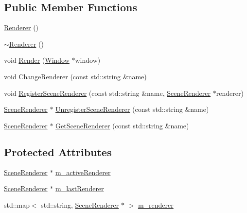 \subsection*{Public Member Functions}
\begin{DoxyCompactItemize}
\item 
\mbox{\hyperlink{classec_1_1_renderer_a1bb0d9ff47eabce408daff8ab55bf4dc}{Renderer}} ()
\item 
\mbox{\hyperlink{classec_1_1_renderer_ab0a97bd174127b670899477a576d1fe6}{$\sim$\+Renderer}} ()
\item 
void \mbox{\hyperlink{classec_1_1_renderer_afe11d20b1d49004bb01bb5db31845803}{Render}} (\mbox{\hyperlink{classec_1_1_window}{Window}} $\ast$window)
\item 
void \mbox{\hyperlink{classec_1_1_renderer_a8c84ae50f78cd6a4ed913d228716ad9b}{Change\+Renderer}} (const std\+::string \&name)
\item 
void \mbox{\hyperlink{classec_1_1_renderer_a74fb04d7d75703f5fe018a806fa82d0e}{Register\+Scene\+Renderer}} (const std\+::string \&name, \mbox{\hyperlink{classec_1_1_scene_renderer}{Scene\+Renderer}} $\ast$renderer)
\item 
\mbox{\hyperlink{classec_1_1_scene_renderer}{Scene\+Renderer}} $\ast$ \mbox{\hyperlink{classec_1_1_renderer_ac5063a2c741004706dfe6dc143f8168f}{Unregister\+Scene\+Renderer}} (const std\+::string \&name)
\item 
\mbox{\hyperlink{classec_1_1_scene_renderer}{Scene\+Renderer}} $\ast$ \mbox{\hyperlink{classec_1_1_renderer_adc19ec1ee2a41ac4229a75d18c0dc60a}{Get\+Scene\+Renderer}} (const std\+::string \&name)
\end{DoxyCompactItemize}
\subsection*{Protected Attributes}
\begin{DoxyCompactItemize}
\item 
\mbox{\hyperlink{classec_1_1_scene_renderer}{Scene\+Renderer}} $\ast$ \mbox{\hyperlink{classec_1_1_renderer_a00afed952025d62a654a5f961a55b342}{m\+\_\+active\+Renderer}}
\item 
\mbox{\hyperlink{classec_1_1_scene_renderer}{Scene\+Renderer}} $\ast$ \mbox{\hyperlink{classec_1_1_renderer_a818d84064fde8088d28358f7ea04f898}{m\+\_\+last\+Renderer}}
\item 
std\+::map$<$ std\+::string, \mbox{\hyperlink{classec_1_1_scene_renderer}{Scene\+Renderer}} $\ast$ $>$ \mbox{\hyperlink{classec_1_1_renderer_ac3f0c1c3253fbac0f734af313cc410a4}{m\+\_\+renderer}}
\end{DoxyCompactItemize}


